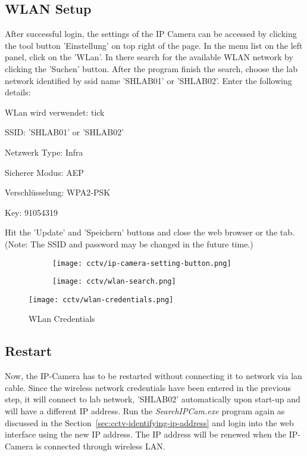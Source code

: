 \subsection{WLAN Setup}
After successful login, the settings of the IP Camera can be accessed by clicking the tool button 'Einstellung' on top right of the page. In the menu list on the left panel, click on the 'WLan'. In there search for the available WLAN network by clicking the 'Suchen' button. After the program finish the search, choose the lab network identified by \ac{ssid} name 'SHLAB01' or 'SHLAB02'. Enter the following details:
\begin{itemize*}
\item WLan wird verwendet: tick
\item SSID: 'SHLAB01' or 'SHLAB02'
\item Netzwerk Type: Infra
\item Sicherer Modus: AEP
\item Verschl\"usselung: WPA2-PSK
\item Key: 91054319
\end{itemize*}
Hit the 'Update' and 'Speichern' buttons and close the web browser or the tab. (Note: The SSID and password may be changed in the future time.)
\begin{figure}[ht]
\caption{IP-Camera WLAN settings}
\label{ip-camera-wlan-settings}
\centering
	\begin{subfigure}{.34\textwidth}
	\texttt{[image: cctv/ip-camera-setting-button.png]}
	\end{subfigure}
	\begin{subfigure}{.63\textwidth}
	\texttt{[image: cctv/wlan-search.png]}
	\end{subfigure}
\end{figure}
\begin{figure}[ht]
\caption{WLan Credentials}
\label{wlan-credentials}
\centering
\texttt{[image: cctv/wlan-credentials.png]}
\end{figure}

\subsection{Restart}
Now, the IP-Camera has to be restarted without connecting it to network via \ac{lan} cable. Since the wireless network credentials have been entered in the previous step, it will connect to lab network, 'SHLAB02' automatically upon start-up and will have a different IP address. Run the \emph{SearchIPCam.exe} program again as discussed in the Section~\ref{sec:cctv-identifying-ip-address} and login into the web interface using the new IP address. The IP address will be renewed when the IP-Camera is connected through wireless LAN.

